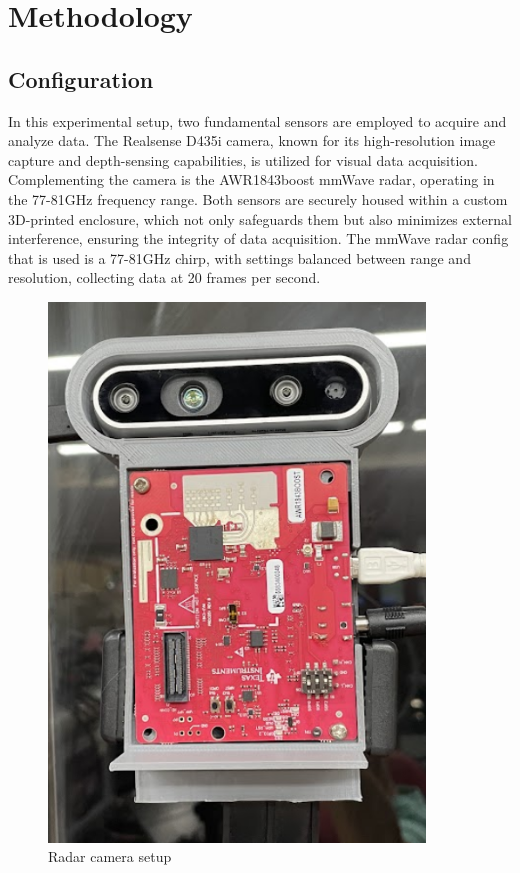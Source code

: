 
\chapter{Methodology}\label{chap:related_works}


\section{Configuration}\label{sec:2-spec}
In this experimental setup, two fundamental sensors are employed to acquire and analyze data.
The Realsense D435i camera, 
known for its high-resolution image capture and depth-sensing capabilities, is utilized for visual data acquisition. 
Complementing the camera is the AWR1843boost mmWave radar, operating in the 77-81GHz frequency range. 
Both sensors are securely housed within a custom 3D-printed enclosure, 
which not only safeguards them but also minimizes external interference, ensuring the integrity of data acquisition. 
The mmWave radar config that is used is a 77-81GHz chirp, with settings balanced between range and resolution,
collecting data at 20 frames per second.

\begin{figure}[hpbt]
    \centering
    \includegraphics[width=10cm]{Figures/radar_camera_setup.png}%
    \caption{Radar camera setup}
    \label{fig:radar_camera_setup_fig}
\end{figure}


